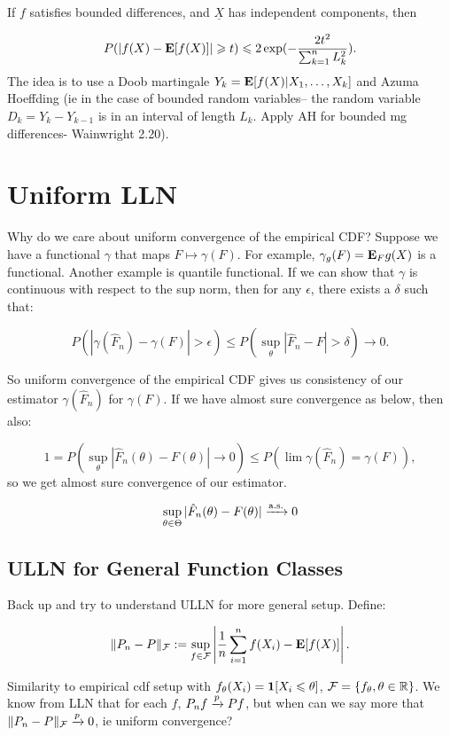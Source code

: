 \documentclass{article}
\begin{document}
\begin{theorem}
If $f$ satisfies bounded differences, and $\underline X$ has independent components, then

$$P(|f(X) - \mathbf{E}[f(X)]|\geqslant t) \leqslant 2\exp(-\frac{2t^2}{\sum_{k=1}^n L_k^2}).$$
The idea is to use a Doob martingale $Y_k = \mathbf{E}[f(X) | X_1,\ldots,X_k]$ and Azuma Hoeffding (ie in the case of bounded random variables-- the random variable $D_k = Y_k - Y_{k-1}$ is in an interval of length $L_k$. Apply AH for bounded mg differences-  Wainwright 2.20). 
\end{theorem}

\section{Uniform LLN}
Why do we care about uniform convergence of the empirical CDF? Suppose we have a functional $\gamma$ that maps $F \mapsto \gamma(F)$. For example, $\gamma_g (F) = \mathbf{E}_F g(X)$ is a functional. Another example is quantile functional. If we can show that $\gamma$ is continuous with respect to the sup norm, then for any $\epsilon$, there exists a $\delta$ such that:

$$P(|\gamma(\hat F_n) - \gamma(F)| > \epsilon) \leq P(\sup_{\theta} |\hat F_n - F| >\delta) \to 0.$$

So uniform convergence of the empirical CDF gives us consistency of our estimator $\gamma(\hat F_n)$ for $\gamma(F)$.  If we have almost sure convergence as below, then also:

$$1= P(\sup_{\theta} |\hat F_n(\theta) - F(\theta)| \to 0) \leq P(\lim \gamma(\hat F_n) = \gamma(F)),$$
so we get almost sure convergence of our estimator.

\begin{theorem}
$$\sup_{\theta \in \Theta} |\hat F_n (\theta) - F(\theta)| \xrightarrow{\mathrm{a.s.}} 0$$
\end{theorem}

\subsection{ULLN for General Function Classes}
Back up and try to understand ULLN for more general setup. Define:

$$\| P_n - P\|_{\mathcal F} := \sup_{f\in \mathcal F} \left|\frac{1}{n} \sum_{i=1}^n f(X_i) - \mathbf{E}[f(X)]\right|.$$

Similarity to empirical cdf setup with $f_\theta(X_i) = \boldsymbol{1}[X_i \leqslant \theta]$, $\mathcal F = \{f_\theta , \theta\in \mathbb R\}$. We know from LLN that for each $f$, $P_nf \xrightarrow{p} Pf$, but when can we say more that $\|P_n - P\|_\mathcal F \xrightarrow{p} 0$, ie uniform convergence? 
\end{document}

